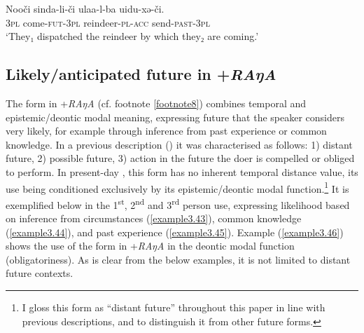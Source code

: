 \documentclass[output=paper,colorlinks,citecolor=brown]{langscibook}
\begin{document}
\ea
\label{example3.42}
\gll Nooči	sinda-li-či		ulaa-l-ba			uidu-xə-či.\\
    		\textsc{3pl}		come-\textsc{fut}-\textsc{3pl}	reindeer-\textsc{pl}-\textsc{acc}	send-\textsc{past}-\textsc{3pl}\\
\glt `They₁ dispatched the reindeer by which they₂ are coming.’
\z


\subsection{Likely/anticipated future in +\textit{RAŋA}}\label{Section3.5.3}

The form in +\textit{RAŋA} (cf. footnote \ref{footnote8}) combines temporal and epistemic/deontic modal meaning, expressing future that the speaker considers very likely, for example through inference from past experience or common knowledge. In a previous description (\citealt{Ikegami_1959}) it was characterised as follows: 1) distant future, 2) possible future, 3) action in the future the doer is compelled or obliged to perform. In present-day , this form has no inherent temporal distance value, its use being conditioned exclusively by its epistemic/deontic modal function.\footnote{I gloss this form as “distant future” throughout this paper in line with previous descriptions, and to distinguish it from other future forms.} It is exemplified below in the 1\textsuperscript{st}, 2\textsuperscript{nd} and 3\textsuperscript{rd} person use, expressing likelihood based on inference from circumstances (\ref{example3.43}), common knowledge (\ref{example3.44}), and past experience (\ref{example3.45}). Example (\ref{example3.46}) shows the use of the form in +\textit{RAŋA} in the deontic modal function (obligatoriness). As is clear from the below examples, it is not limited to distant future contexts.
\end{document}
